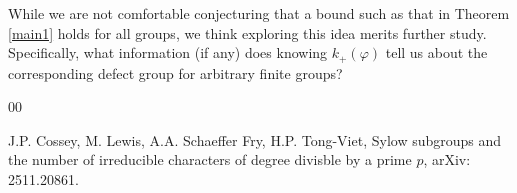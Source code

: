 \documentclass[11pt]{amsart}
\begin{document}
While we are not comfortable conjecturing that a bound such as that in Theorem \ref{main1} holds for all groups, we think exploring this idea merits further study.  Specifically, what information (if any) does knowing $k_+(\varphi)$ tell us about the corresponding defect group for arbitrary finite groups?


\begin{thebibliography}{00}







 J.P. Cossey, M. Lewis, A.A. Schaeffer Fry, H.P. Tong-Viet, Sylow subgroups and the number of irreducible characters of degree divisble by a prime $p$, arXiv: 2511.20861.





\end{thebibliography}
\end{document}
